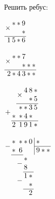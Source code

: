 \begin{listofex}
	\item Решить ребус:
	\begin{enumcols}[itemcolumns=3]
		\item
		$\arraycolsep=0.1em\begin{array}{rrrr}
			&*&*&9\\
			\smash{\raisebox{1.3ex}{\( \times \)}}&&&*\\
			\cline{1-4}
			1&5&*&6
		\end{array}$
		\item
		$\arraycolsep=0.1em\begin{array}{rrrrrr}
			&*&*&7\\
			\smash{\raisebox{1.3ex}{\( \times \)}}&&&*&*&*\\
			\cline{1-6}
			2&*&4&3&*&*
		\end{array}$
		\item
		$\arraycolsep=0.1em\begin{array}{rrrrrr}
			&&&4&8&*\\
			&&\smash{\raisebox{1.3ex}{\( \times \)}}&&*&5\\
			\cline{3-6}
			&&*&*&3&5\\
			\smash{\raisebox{1.3ex}{\( + \)}}&*&*&4&*\\
			\cline{2-6}
			&2&1&9&1&*
		\end{array}$
		\item
		$\arraycolsep=0.1em\begin{array}{rrrrr@{\,}r|l}
			&*&*&*&0&&\,*\\
			\cline{7-7}
			\smash{\raisebox{1.3ex}{\( - \)}}&*&6&&&&\,9**\\
			\cline{2-3}
			&&&*\\
			&&\smash{\raisebox{1.3ex}{\( - \)}}&8\\
			\cline{4-5}
			&&&1&*\\
			&&\smash{\raisebox{1.3ex}{\( - \)}}&&*\\
			\cline{4-5}
			&&&&2\\
		\end{array}$
		
	\end{enumcols}
	
\end{listofex}